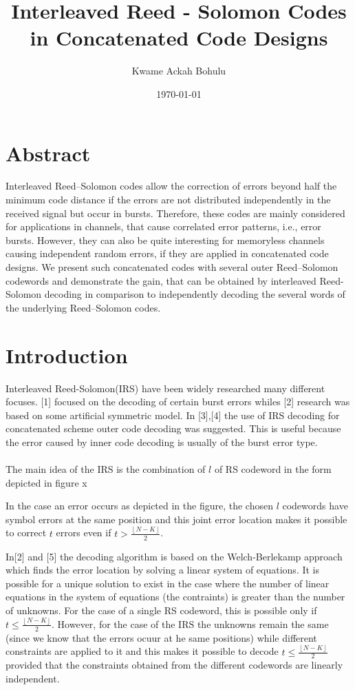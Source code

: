 \documentclass[fontsize=12pt]{article}
\title{Interleaved Reed - Solomon Codes in Concatenated
Code Designs}
\author{Kwame Ackah Bohulu}
\date{\today}
\begin{document}
\maketitle

\newpage
\section{Abstract}
Interleaved Reed–Solomon codes allow the correction
of errors beyond half the minimum code distance if the
errors are not distributed independently in the received signal
but occur in bursts. Therefore, these codes are mainly considered
for applications in channels, that cause correlated error patterns,
i.e., error bursts. However, they can also be quite interesting
for memoryless channels causing independent random errors, if
they are applied in concatenated code designs. We present such
concatenated codes with several outer Reed–Solomon codewords
and demonstrate the gain, that can be obtained by interleaved
Reed-Solomon decoding in comparison to independently decoding
the several words of the underlying Reed–Solomon codes.
\section{Introduction}
Interleaved Reed-Solomon(IRS) have been widely researched many different focuses. 
[1] focused on the decoding of certain burst errors whiles [2] research was based on some artificial symmetric model. In [3],[4] the use of IRS decoding for concatenated scheme outer code decoding was suggested. This is useful because the error caused by inner code decoding is  usually of the burst error type. 
\paragraph{}
The main idea of the IRS is the combination of $l$ of RS codeword in the form depicted in figure x

In the case an error occurs as depicted in the figure, the chosen $l$ codewords have symbol errors at the same position and this joint error location makes it possible to correct $t$ errors even if $t>\frac{\left \lfloor{N - K} \right \rfloor}{2}$. 

In[2] and [5] the decoding algorithm is based on the Welch-Berlekamp approach which finds the error location by solving a linear system of equations. It is possible for a unique solution to exist in the case where the number of linear equations in the system of equations (the contraints) is greater than the number of unknowns. For the case of a single RS codeword, this is possible only if 
$t\leq \frac{\left \lfloor{N - K} \right \rfloor}{2}$. However, for the case of the IRS the unknowns remain the same (since we know that the errors ocuur at he same positions) while different constraints are applied to it and this makes it possible to decode 
$t\leq \frac{\left \lfloor{N - K} \right \rfloor}{2}$ provided that the constraints obtained from the different codewords are linearly independent.
\end{document}
